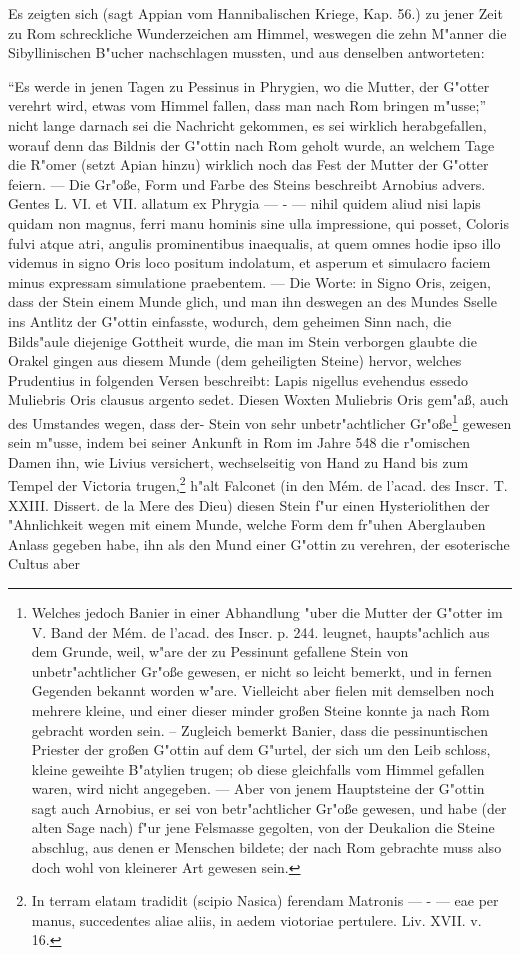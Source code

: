 \documentclass[a4paper, 11pt, oneside, polutonikogreek, german]{article}
\begin{document}
Es zeigten sich (sagt Appian vom Hannibalischen Kriege, Kap. 56.) zu jener Zeit zu Rom schreckliche Wunderzeichen am Himmel, weswegen die zehn M"anner die Sibyllinischen B"ucher nachschlagen mussten, und aus denselben antworteten:

"`Es werde in jenen Tagen zu Pessinus in Phrygien, wo die Mutter, der G"otter verehrt wird, etwas vom Himmel fallen, dass man nach Rom bringen m"usse;"' nicht lange darnach sei die Nachricht gekommen, es sei wirklich herabgefallen, worauf denn das Bildnis der G"ottin nach Rom geholt wurde, an welchem Tage die R"omer (setzt Apian hinzu) wirklich noch das Fest der Mutter der G"otter feiern. --- Die Gr"oße, Form und Farbe des Steins beschreibt Arnobius advers. Gentes L. VI. et VII. allatum ex Phrygia --- - --- nihil quidem aliud nisi lapis quidam non magnus, ferri manu hominis sine ulla impressione, qui posset, Coloris fulvi atque atri, angulis prominentibus inaequalis, at quem omnes hodie ipso illo videmus in signo Oris loco positum indolatum, et asperum et simulacro faciem minus expressam simulatione praebentem. --- Die Worte: in Signo Oris, zeigen, dass der Stein einem Munde glich, und man ihn deswegen an des Mundes Sselle ins Antlitz der G"ottin einfasste, wodurch, dem geheimen Sinn nach, die Bilds"aule diejenige Gottheit wurde, die man im Stein verborgen glaubte die Orakel gingen aus diesem Munde (dem geheiligten Steine) hervor, welches Prudentius in folgenden Versen beschreibt: Lapis nigellus evehendus essedo Muliebris Oris clausus argento sedet. Diesen Woxten Muliebris Oris gem"aß, auch des Umstandes wegen, dass der- Stein von sehr unbetr"achtlicher Gr"oße\footnote{Welches jedoch Banier in einer Abhandlung "uber die Mutter der G"otter im V. Band der Mém. de l'acad. des Inscr. p. 244. leugnet, haupts"achlich aus dem Grunde, weil, w"are der zu Pessinunt gefallene Stein von unbetr"achtlicher Gr"oße gewesen, er nicht so leicht bemerkt, und in fernen Gegenden bekannt worden w"are. Vielleicht aber fielen mit demselben noch mehrere kleine, und einer dieser minder großen Steine konnte ja nach Rom gebracht worden sein. -- Zugleich bemerkt Banier, dass die pessinuntischen Priester der großen G"ottin auf dem G"urtel, der sich um den Leib schloss, kleine geweihte B"atylien trugen; ob diese gleichfalls vom Himmel gefallen waren, wird nicht angegeben. --- Aber von jenem Hauptsteine der G"ottin sagt auch Arnobius, er sei von betr"achtlicher Gr"oße gewesen, und habe (der alten Sage nach) f"ur jene Felsmasse gegolten, von der Deukalion die Steine abschlug, aus denen er Menschen bildete; der nach Rom gebrachte muss also doch wohl von kleinerer Art gewesen sein.} gewesen sein m"usse, indem bei seiner Ankunft in Rom im Jahre 548 die r"omischen Damen ihn, wie Livius versichert, wechselseitig von Hand zu Hand bis zum Tempel der Victoria trugen,\footnote{In terram elatam tradidit (scipio Nasica) ferendam Matronis --- - --- eae per manus, succedentes aliae aliis, in aedem viotoriae pertulere. Liv. XVII. v. 16.} h"alt Falconet (in den Mém. de l'acad. des Inscr. T. XXIII. Dissert. de la Mere des Dieu) diesen Stein f"ur einen Hysteriolithen der "Ahnlichkeit wegen mit einem Munde, welche Form dem fr"uhen Aberglauben Anlass gegeben habe, ihn als den Mund einer G"ottin zu verehren, der esoterische Cultus aber 
\end{document}
